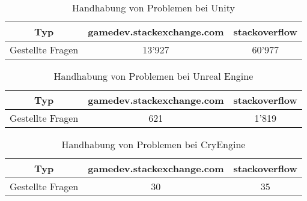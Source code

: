\begin{table}[h]
	\centering
	\caption[Handhabung von Problemen bei Unity]{Handhabung von Problemen bei Unity}
	\label{tab:handhabung_von_problemen_bei_unity}
	\begin{tabular}{c|c|c}
		\toprule
		Typ & gamedev.stackexchange.com\cite{game_development_stack_exchange_newest_nodate} & stackoverflow\cite{stack_overflow_newest_nodate}\\
		\midrule
		Gestellte Fragen & 13'927 & 60'977  \\
		\bottomrule 
	\end{tabular}
\end{table}

\begin{table}[h]
	\centering
	\caption[Handhabung von Problemen bei Unreal Engine]{Handhabung von Problemen bei Unreal Engine}
	\label{tab:handhabung_von_problemen_bei_unreal_engine}
	\begin{tabular}{c|c|c}
		\toprule
		Typ & gamedev.stackexchange.com\cite{game_development_stack_exchange_newest_nodate-1} & stackoverflow\cite{stack_overflow_newest_nodate-2}\\
		\midrule
		Gestellte Fragen & 621 & 1'819  \\
		\bottomrule 
	\end{tabular}
\end{table}


\begin{table}[h]
	\centering
	\caption[Handhabung von Problemen bei CryEngine]{Handhabung von Problemen bei CryEngine}
	\label{tab:handhabung_von_problemen_bei_cryengine}
	\begin{tabular}{c|c|c}
		\toprule
		Typ & gamedev.stackexchange.com\cite{game_development_stack_exchange_newest_nodate-2} & stackoverflow\cite{stack_overflow_newest_nodate-1}\\
		\midrule
		Gestellte Fragen & 30 & 35 \\
		\bottomrule 
	\end{tabular}
\end{table}


